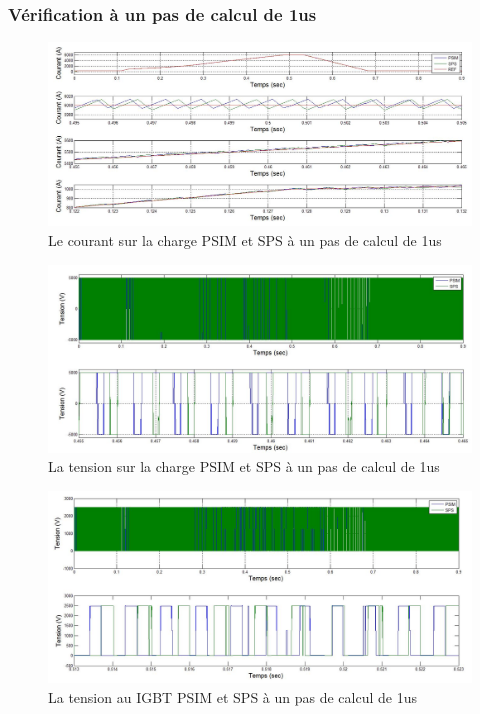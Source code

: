 \documentclass[11pt,letterpaper,final]{report}
\begin{document}
\clearpage
\subsubsection{Vérification à un pas de calcul de 1us}


\begin{figure}[h!]
\centering
\includegraphics[scale=0.5]{Fig/DCPDCN/DCPCourantCharge1u.jpg}
\caption{Le courant sur la charge PSIM et SPS à un pas de calcul de 1us}
\label{DC_ch_cou_1}
\end{figure}


\begin{figure}[h!]
\centering
\includegraphics[scale=0.5]{Fig/DCPDCN/DCPTensionCharge1u.jpg}
\caption{La tension sur la charge PSIM et SPS à un pas de calcul de 1us}
\label{DC_ch_ten_1}
\end{figure}


\begin{figure}[h!]
\centering
\includegraphics[scale=0.5]{Fig/DCPDCN/DCPTensionIGBT1u.jpg}
\caption{La tension au IGBT PSIM et SPS à un pas de calcul de 1us}
\label{DC_IG_ten_1}
\end{figure}
\end{document}
